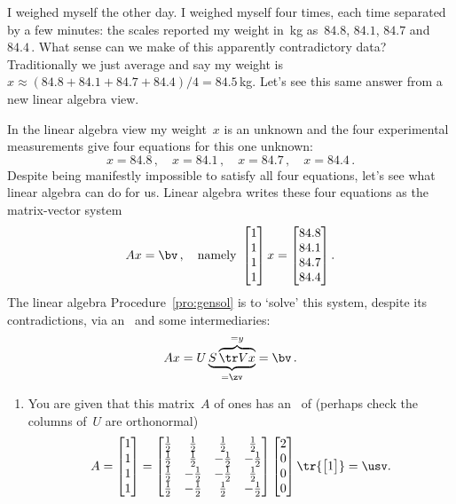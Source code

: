\begin{example} \label{eg:fourwts}
I weighed myself the other day. 
I weighed myself four times, each time separated by a few minutes:  the scales reported my weight in~kg as~\(84.8\), \(84.1\), \(84.7\) and~\(84.4\)\,.
What sense can we make of this apparently contradictory data?
Traditionally we just average and say my weight is \(x\approx (84.8+84.1+84.7+84.4)/4=84.5\)\,kg.
Let's see this same answer from a new linear algebra view.

In the linear algebra view my weight~\(x\) is an unknown and the four experimental measurements give four equations for this one unknown:
\begin{equation*}
x=84.8\,,\quad
x=84.1\,,\quad
x=84.7\,,\quad
x=84.4\,.
\end{equation*}
Despite being manifestly impossible to satisfy all four equations, let's see what linear algebra can do for us.
Linear algebra writes these four equations as the matrix-vector system
\begin{equation*}
Ax=\bv\,,\quad\text{namely }
\begin{bmatrix} 1\\1\\1\\1 \end{bmatrix}x
=\begin{bmatrix} 84.8\\84.1\\84.7\\84.4 \end{bmatrix}.
\end{equation*}
The linear algebra Procedure~\ref{pro:gensol} is to `solve' this system, despite its contradictions, via an \svd\ and some intermediaries:
\begin{equation*}
Ax=U\underbrace{S\overbrace{\tr Vx}^{=y}}_{=\zv}=\bv\,.
\end{equation*}

\begin{enumerate}
\item You are given that this matrix~\(A\) of ones has an \svd\ of (perhaps check the columns of~\(U\) are orthonormal)
\def\h{\frac12}
\begin{equation*}
A=\begin{bmatrix} 1\\1\\1\\1 \end{bmatrix}
=\begin{bmatrix} \h&\h&\h&\h
\\\h&\h&-\h&-\h
\\\h&-\h&-\h&\h
\\\h&-\h&\h&-\h \end{bmatrix}
\begin{bmatrix} 2\\0\\0\\0 \end{bmatrix}
\tr{\begin{bmatrix} 1 \end{bmatrix}}
=\usv.
\end{equation*}


\end{enumerate}
\end{example}
